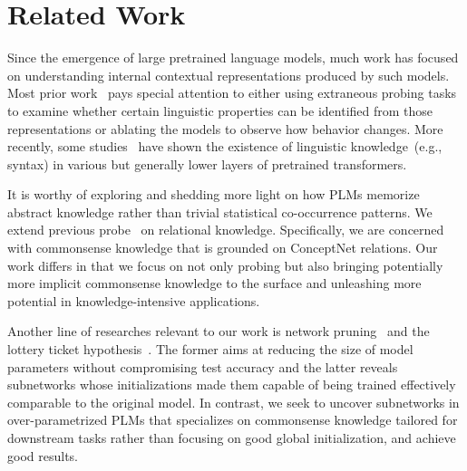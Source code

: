 \section{Related Work}
Since the emergence of large pretrained language models, 
much work has focused on understanding internal contextual representations 
produced by such models. Most prior work~\citep{shi-etal-2016-string,belinkov-etal-2017-neural} pays special attention to either using extraneous 
probing tasks to examine whether certain linguistic properties 
can be identified from those representations or ablating the models 
to observe how behavior changes. More recently, some studies~\citep{peters-etal-2018-dissecting,DBLP:journals/corr/abs-1901-05287,DBLP:journals/corr/abs-1905-06316} have shown the existence 
of linguistic knowledge~(e.g., syntax) in various but 
generally lower layers of pretrained transformers.

It is worthy of exploring and shedding more light on how PLMs 
memorize abstract knowledge rather than trivial statistical co-occurrence 
patterns.  We extend previous probe~\citep{Petroni2020} on relational 
knowledge. Specifically, we are concerned with commonsense knowledge 
that is grounded on ConceptNet relations. Our work differs in that 
we focus on not only probing but also bringing potentially more 
implicit commonsense knowledge to the surface and unleashing more 
potential in knowledge-intensive applications.

Another line of researches relevant to our work is network 
pruning~\citep{liu2018rethinking,Lin2020Dynamic} and the lottery ticket 
hypothesis~\citep{conf/iclr/FrankleC19,Prasanna2020,Chen2020}. 
The former aims at reducing the size of model parameters without 
compromising test accuracy and the latter reveals subnetworks whose 
initializations made them capable of being trained effectively comparable 
to the original model. In contrast, we seek to uncover subnetworks in 
over-parametrized PLMs that specializes on commonsense knowledge 
tailored for downstream tasks rather than focusing on good global
initialization, and achieve good results. 
